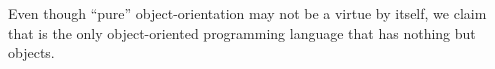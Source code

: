 \begin{table}
\label{tab:languages}

\end{table}

Even though ``pure'' object-orientation may not be a virtue by itself, we claim that \eolang{} is the only object-oriented programming language that has nothing but objects.

